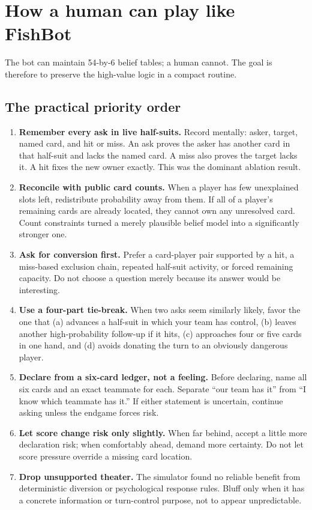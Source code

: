 \documentclass[11pt]{article}
\begin{document}
\section{How a human can play like FishBot}

The bot can maintain 54-by-6 belief tables; a human cannot. The goal is therefore to preserve the high-value logic in a compact routine.

\subsection{The practical priority order}

\begin{enumerate}
  \item \textbf{Remember every ask in live half-suits.} Record mentally: asker, target, named card, and hit or miss. An ask proves the asker has another card in that half-suit and lacks the named card. A miss also proves the target lacks it. A hit fixes the new owner exactly. This was the dominant ablation result.
  \item \textbf{Reconcile with public card counts.} When a player has few unexplained slots left, redistribute probability away from them. If all of a player's remaining cards are already located, they cannot own any unresolved card. Count constraints turned a merely plausible belief model into a significantly stronger one.
  \item \textbf{Ask for conversion first.} Prefer a card-player pair supported by a hit, a miss-based exclusion chain, repeated half-suit activity, or forced remaining capacity. Do not choose a question merely because its answer would be interesting.
  \item \textbf{Use a four-part tie-break.} When two asks seem similarly likely, favor the one that (a) advances a half-suit in which your team has control, (b) leaves another high-probability follow-up if it hits, (c) approaches four or five cards in one hand, and (d) avoids donating the turn to an obviously dangerous player.
  \item \textbf{Declare from a six-card ledger, not a feeling.} Before declaring, name all six cards and an exact teammate for each. Separate ``our team has it'' from ``I know which teammate has it.'' If either statement is uncertain, continue asking unless the endgame forces risk.
  \item \textbf{Let score change risk only slightly.} When far behind, accept a little more declaration risk; when comfortably ahead, demand more certainty. Do not let score pressure override a missing card location.
  \item \textbf{Drop unsupported theater.} The simulator found no reliable benefit from deterministic diversion or psychological response rules. Bluff only when it has a concrete information or turn-control purpose, not to appear unpredictable.
\end{enumerate}
\end{document}
